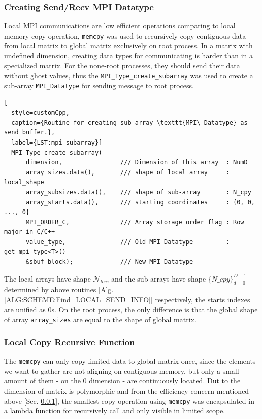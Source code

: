 \subsubsection{Creating Send/Recv MPI Datatype}\label{SEC:Creating_Send/Recv_MPI_Datatype}
Local MPI communications are low efficient operations comparing to local memory copy operation, \texttt{memcpy} was used to 
recursively copy contiguous data from local matrix to global matrix exclusively on root process.
In a matrix with undefined dimension, creating data types for communicating is harder than in a specialized matrix.
For the none-root processes, they should send their data without ghost values, thus 
the \texttt{MPI\_Type\_create\_subarray} was used to create a sub-array \texttt{MPI\_Datatype} for sending message to root process.
\begin{lstlisting}[
  style=customCpp,
  caption={Routine for creating sub-array \texttt{MPI\_Datatype} as send buffer.}, 
  label={LST:mpi_subarray}]
  MPI_Type_create_subarray( 
      dimension,                /// Dimension of this array  : NumD
      array_sizes.data(),       /// shape of local array     : local_shape
      array_subsizes.data(),    /// shape of sub-array       : N_cpy
      array_starts.data(),      /// starting coordinates     : {0, 0, ..., 0}
      MPI_ORDER_C,              /// Array storage order flag : Row major in C/C++
      value_type,               /// Old MPI Datatype         : get_mpi_type<T>()
      &sbuf_block);             /// New MPI Datatype
\end{lstlisting}
The local arrays have shape $\mathcal{N}_{loc}$, and the sub-arrays have shape $\{N\_{cpy}\}_{d=0}^{D-1}$ determined by above routines 
                                            [Alg. \ref{ALG:SCHEME:Find_LOCAL_SEND_INFO}]
respectively, the starts indexes are unified as $0$s.
On the root process, the only difference is that the global shape of array \texttt{array\_sizes} are equal to the shape of global matrix.

\subsubsection{Local Copy Recursive Function}
The \texttt{memcpy} can only copy limited data to global matrix once,
since the elements we want to gather are not aligning on contiguous memory, 
but only a small amount of them - on the $0$ dimension - are continuously located.
Dut to the dimension of matrix is polymorphic and from the efficiency concern mentioned above 
            [Sec. \ref{SEC:Creating_Send/Recv_MPI_Datatype}],
the smallest copy operation using \texttt{memcpy} was encapsulated in a lambda function for recursively call and only visible in limited scope.

